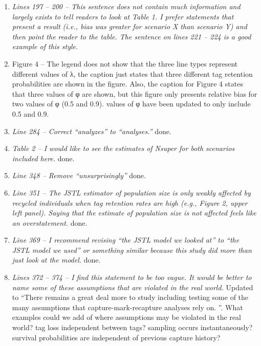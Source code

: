 \documentclass[12pt]{article}
\begin{document}
\begin{enumerate}
\begin{enumerate}
\item {\it Lines 197 – 200 – This sentence does not contain much information and largely exists to tell readers to look at Table 1. I prefer statements that present a result (i.e., bias was greater for scenario X than scenario Y) and then point the reader to the table. The sentence on lines 221 – 224 is a good example of this style.}

\item{Figure 4 – The legend does not show that the three line types represent different values of λ, the caption just states that three different tag retention probabilities are shown in the figure. Also, the caption for Figure 4 states that three values of φ are shown, but this figure only presents relative bias for two values of φ (0.5 and 0.9).}
values of φ have been updated to only include 0.5 and 0.9. 

\item {\it Line 284 – Correct “analyzes” to “analyses.”} 
done.

\item {\it Table 2 – I would like to see the estimates of Nsuper for both scenarios included here.}
done.

\item {\it Line 348 – Remove “unsurprisingly”} 
done.

\item {\it Line 351 – The JSTL estimator of population size is only weakly affected by recycled individuals when tag retention rates are high (e.g., Figure 2, upper left panel). Saying that the estimate of population size is not affected feels like an overstatement.} 
done.

\item {\it Line 369 – I recommend revising “the JSTL model we looked at” to “the JSTL model we used” or something similar because this study did more than just look at the model.} 
done.

\item {\it Lines 372 – 374 – I find this statement to be too vague. It would be better to name some of these assumptions that are violated in the real world.}
Updated to ``There remains a great deal more to study including testing some of the many assumptions that capture-mark-recapture analyses rely on. ''.  What examples could we add of where assumptions may be violated in the real world? tag loss independent between tags? sampling occurs instantaneously? survival probabilities are independent of previous capture history? 


\end{enumerate}
\end{enumerate}
\end{document}

